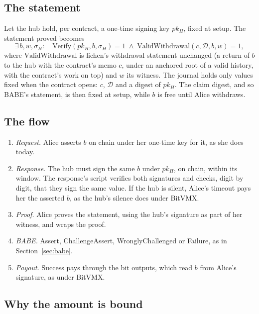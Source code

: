 \documentclass[11pt]{article}
\begin{document}
\subsection{The statement}

Let the hub hold, per contract, a one-time signing key $pk_H$, fixed at
setup. The statement proved becomes
\[
  \exists\, b, w, \sigma_H:\quad
  \mathrm{Verify}(pk_H, b, \sigma_H) = 1 \;\wedge\;
  \mathrm{ValidWithdrawal}(c, \mathcal{D}, b, w) = 1,
\]
where $\mathrm{ValidWithdrawal}$ is lichen's withdrawal statement
unchanged (a return of $b$ to the hub with the contract's memo $c$, under
an anchored root of a valid history, with the contract's work on top)
and $w$ its witness. The journal holds only values fixed when the
contract opens: $c$, $\mathcal{D}$ and a digest of $pk_H$. The claim digest, and
so BABE's statement, is then fixed at setup, while $b$ is free until
Alice withdraws.

\subsection{The flow}

\begin{enumerate}[leftmargin=1.5em]
\item \emph{Request.} Alice asserts $b$ on chain under her one-time key
  for it, as she does today.
\item \emph{Response.} The hub must sign the same $b$ under $pk_H$, on
  chain, within its window. The response's script verifies both
  signatures and checks, digit by digit, that they sign the same value.
  If the hub is silent, Alice's timeout pays her the asserted $b$, as
  the hub's silence does under BitVMX.
\item \emph{Proof.} Alice proves the statement, using the hub's
  signature as part of her witness, and wraps the proof.
\item \emph{BABE.} Assert, ChallengeAssert, WronglyChallenged or
  Failure, as in Section~\ref{sec:babe}.
\item \emph{Payout.} Success pays through the bit outputs, which read
  $b$ from Alice's signature, as under BitVMX.
\end{enumerate}

\subsection{Why the amount is bound}
\label{sec:binding}
\end{document}
